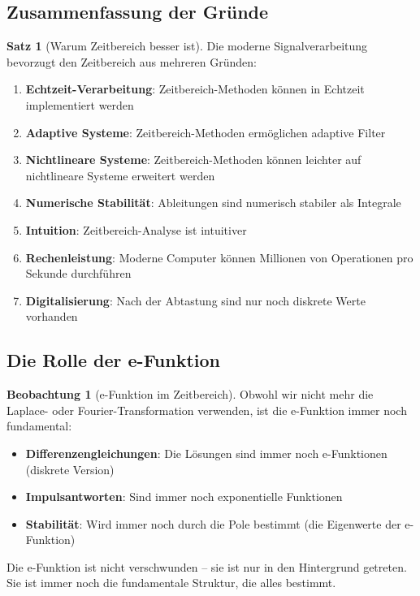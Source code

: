 ﻿\documentclass[a4paper,12pt]{report}
\theoremstyle{definition}
\newtheorem{satz}{Satz}
\newtheorem{beobachtung}{Beobachtung}
\begin{document}
	\subsection{Zusammenfassung der Gründe}
	
	\begin{satz}[Warum Zeitbereich besser ist]
		
		Die moderne Signalverarbeitung bevorzugt den Zeitbereich aus mehreren Gründen:
		
		\begin{enumerate}
			\item[-] \textbf{Echtzeit-Verarbeitung}: Zeitbereich-Methoden können in Echtzeit implementiert werden
			\item[-] \textbf{Adaptive Systeme}: Zeitbereich-Methoden ermöglichen adaptive Filter
			\item[-] \textbf{Nichtlineare Systeme}: Zeitbereich-Methoden können leichter auf nichtlineare Systeme erweitert werden
			\item[-] \textbf{Numerische Stabilität}: Ableitungen sind numerisch stabiler als Integrale
			\item[-] \textbf{Intuition}: Zeitbereich-Analyse ist intuitiver
			\item[-] \textbf{Rechenleistung}: Moderne Computer können Millionen von Operationen pro Sekunde durchführen
			\item[-] \textbf{Digitalisierung}: Nach der Abtastung sind nur noch diskrete Werte vorhanden
		\end{enumerate}
	\end{satz}
	
	\subsection{Die Rolle der e-Funktion}
	
	\begin{beobachtung}[e-Funktion im Zeitbereich]
		
		Obwohl wir nicht mehr die Laplace- oder Fourier-Transformation verwenden, ist die e-Funktion immer noch fundamental:
		
		\begin{itemize}
			\item[-] \textbf{Differenzengleichungen}: Die Lösungen sind immer noch e-Funktionen (diskrete Version)
			\item[-] \textbf{Impulsantworten}: Sind immer noch exponentielle Funktionen
			\item[-] \textbf{Stabilität}: Wird immer noch durch die Pole bestimmt (die Eigenwerte der e-Funktion)
		\end{itemize}
		
		Die e-Funktion ist nicht verschwunden -- sie ist nur in den Hintergrund getreten. Sie ist immer noch die fundamentale Struktur, die alles bestimmt.
	\end{beobachtung}
	
\end{document}
